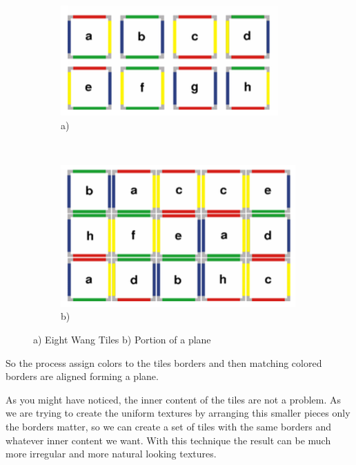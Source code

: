 \begin{figure}
        \centering
		\begin{subfigure}[b]{0.4\textwidth}
			\includegraphics[width=\textwidth]{img/Theory/Tiling/tiles.png}
			\caption{a)}
			\label{fig:TTileSet}
		\end{subfigure}
        ~ ~%
		\begin{subfigure}[b]{0.4\textwidth}
			\includegraphics[width=\textwidth]{img/Theory/Tiling/plane.png}
			\caption{b)}
			\label{fig:TPlanePortion}
		\end{subfigure}
        \caption{a) Eight Wang Tiles b) Portion of a plane}
        \label{fig:WangTiles}
\end{figure}

So the process assign colors to the tiles borders and then matching colored borders are aligned forming a plane.


As you might have noticed, the inner content of the tiles are not a problem. As we are trying to create the uniform textures by arranging this smaller pieces only the borders matter, so we can create a set of tiles with the same borders and whatever inner content we want. With this technique the result can be much more irregular and more natural looking textures.



